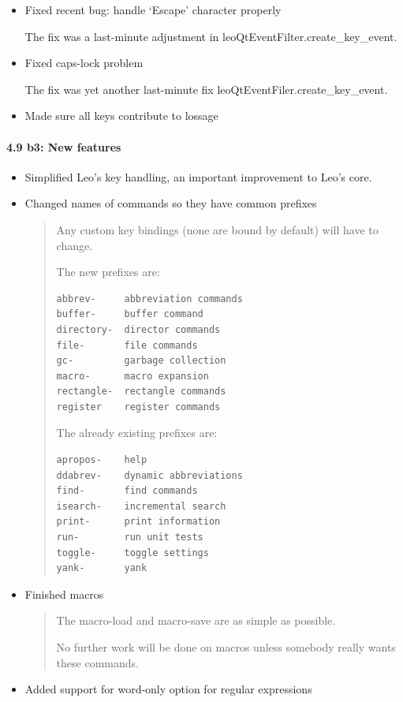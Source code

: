 \documentclass[a4paper,10pt,english]{sphinxmanual}
\begin{document}
\begin{itemize}
\item {} 
Fixed recent bug: handle `Escape' character properly

The fix was a last-minute adjustment in leoQtEventFilter.create\_key\_event.

\item {} 
Fixed caps-lock problem

The fix was yet another last-minute fix leoQtEventFiler.create\_key\_event.

\item {} 
Made sure all keys contribute to lossage

\end{itemize}


\paragraph{4.9 b3: New features}
\label{what-is-new:b3-new-features}\begin{itemize}
\item {} 
Simplified Leo's key handling, an important improvement to Leo's core.

\item {} 
Changed names of commands so they have common prefixes
\begin{quote}

Any custom key bindings (none are bound by default) will have to change.

The new prefixes are:

\begin{Verbatim}[commandchars=\\\{\}]
abbrev-     abbreviation commands
buffer-     buffer command
directory-  director commands
file-       file commands
gc-         garbage collection
macro-      macro expansion
rectangle-  rectangle commands
register    register commands
\end{Verbatim}

The already existing prefixes are:

\begin{Verbatim}[commandchars=\\\{\}]
apropos-    help
ddabrev-    dynamic abbreviations
find-       find commands
isearch-    incremental search
print-      print information
run-        run unit tests
toggle-     toggle settings
yank-       yank
\end{Verbatim}
\end{quote}

\item {} 
Finished macros
\begin{quote}

The macro-load and macro-save are as simple as possible.

No further work will be done on macros unless somebody really wants these commands.
\end{quote}

\item {} 
Added support for word-only option for regular expressions

\end{itemize}
\end{document}
